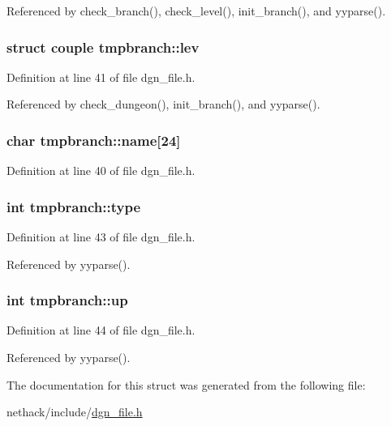 Referenced by check\+\_\+branch(), check\+\_\+level(), init\+\_\+branch(), and yyparse().

\hypertarget{structtmpbranch_ac252dc9730d4ec4331c790df34565826}{
\subsubsection[{lev}]{\setlength{\rightskip}{0pt plus 5cm}struct {\bf couple} tmpbranch\+::lev}}\label{structtmpbranch_ac252dc9730d4ec4331c790df34565826}


Definition at line 41 of file dgn\+\_\+file.\+h.



Referenced by check\+\_\+dungeon(), init\+\_\+branch(), and yyparse().

\hypertarget{structtmpbranch_a843f9c87ed77de34700c0d6a885c00b5}{
\subsubsection[{name}]{\setlength{\rightskip}{0pt plus 5cm}char tmpbranch\+::name\mbox{[}24\mbox{]}}}\label{structtmpbranch_a843f9c87ed77de34700c0d6a885c00b5}


Definition at line 40 of file dgn\+\_\+file.\+h.

\hypertarget{structtmpbranch_a52ef1847b2633177de412c5e0490c93e}{
\subsubsection[{type}]{\setlength{\rightskip}{0pt plus 5cm}int tmpbranch\+::type}}\label{structtmpbranch_a52ef1847b2633177de412c5e0490c93e}


Definition at line 43 of file dgn\+\_\+file.\+h.



Referenced by yyparse().

\hypertarget{structtmpbranch_aaf8a1b40b676b026392ab8bd8f91bf87}{
\subsubsection[{up}]{\setlength{\rightskip}{0pt plus 5cm}int tmpbranch\+::up}}\label{structtmpbranch_aaf8a1b40b676b026392ab8bd8f91bf87}


Definition at line 44 of file dgn\+\_\+file.\+h.



Referenced by yyparse().



The documentation for this struct was generated from the following file\+:\begin{DoxyCompactItemize}
\item 
nethack/include/\hyperlink{dgn__file_8h}{dgn\+\_\+file.\+h}\end{DoxyCompactItemize}
